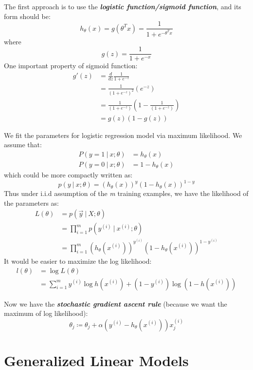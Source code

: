 \documentclass{article}
\begin{document}
The first approach is to use the \emph{\textbf{logistic function/sigmoid function}}, and its form should be:
\begin{equation*}
h_\theta(x)=g(\theta^Tx)=\frac{1}{1+e^{-\theta^Tx}}
\end{equation*}
where
\begin{equation*}
g(z)=\frac{1}{1+e^{-x}}
\end{equation*}
One important property of sigmoid function:
\begin{align*}
g'(z) &= \frac{d}{dz}\frac{1}{1+e^{-z}} \\
      &= \frac{1}{{(1+e^{-z})}^2}(e^{-z}) \\
      &= \frac{1}{(1+e^{-z})}\left(1-\frac{1}{(1+e^{-z})}\right) \\
      &= g(z)(1-g(z))
\end{align*}

We fit the parameters for logistic regression model via maximum likelihood.
We assume that:
\begin{align*}
P(y=1\ |\ x;\theta) &= h_\theta(x) \\
P(y=0\ |\ x;\theta) &= 1 - h_\theta(x)
\end{align*}
which could be more compactly written as:
\begin{equation*}
p(y\ |\ x;\theta) = (h_\theta(x))^y(1-h_\theta(x))^{1-y}
\end{equation*}
Thus under i.i.d assumption of the \emph{m} training examples, we have the likelihood of the parameters as:
\begin{align*}
L(\theta) &= p(\vec{y}\ |\ X;\theta) \\
          &= \prod\limits_{i=1}^mp(y^{(i)}\ |\ x^{(i)};\theta) \\
          &= \prod\limits_{i=1}^m\left(h_\theta(x^{(i)})\right)^{y^{(i)}}\left(1-h_\theta(x^{(i)})\right)^{1-y^{(i)}}
\end{align*}
It would be easier to maximize the log likelihood:
\begin{align*}
l(\theta) &= \log L(\theta) \\
          &= \sum\limits_{i=1}^my^{(i)}\log h(x^{(i)}) + (1-y^{(i)}) \log(1-h(x^{(i)}))
\end{align*}

Now we have the \emph{\textbf{stochastic gradient ascent rule}} (because we want the maximum of log likelihood):
\begin{equation*}
\theta_j\coloneqq\theta_j + \alpha(y^{(i)}-h_\theta(x^{(i)}))x_j^{(i)}
\end{equation*}


\section{Generalized Linear Models}
\end{document}
